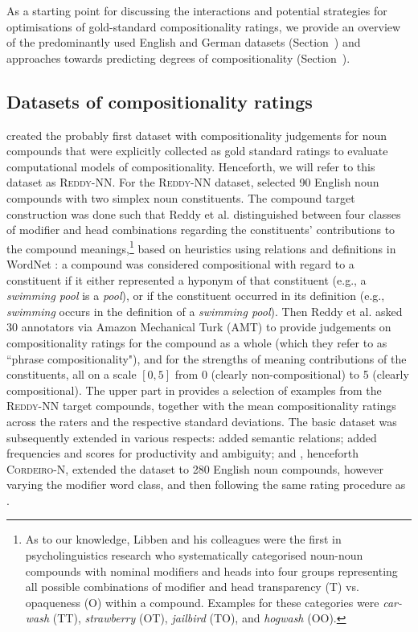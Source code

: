 \documentclass[output=paper,colorlinks,citecolor=brown]{langscibook}
\begin{document}
As a starting point for discussing the interactions and potential strategies for optimisations of gold-standard compositionality ratings, we provide an overview of the predominantly used English and German datasets (Section~) and approaches towards predicting degrees of compositionality (Section~).

\subsection{Datasets of compositionality ratings}\label{sec:overview-datasets}

\citet{ReddyEtAl:11a} created the probably first dataset with compositionality judgements for noun compounds that were explicitly collected as gold standard ratings to evaluate computational models of compositionality. Henceforth, we will refer to this dataset as \textsc{Reddy-NN}. For the \textsc{Reddy-NN} dataset, \citet{ReddyEtAl:11a} selected 90 English noun compounds with two simplex noun constituents. The compound target construction was done such that Reddy et al. distinguished between four classes of modifier and head combinations regarding the constituents' contributions to the compound meanings,\footnote{As to our knowledge, Libben and his colleagues \citep{LibbenEtAl:97, LibbenEtAl:03} were the first in psycholinguistics research who systematically categorised noun-noun compounds with nominal modifiers and heads into four groups representing all possible combinations of modifier and head transparency (T) vs. opaqueness (O) within a compound. Examples for these categories were \textit{car-wash} (TT), \textit{strawberry} (OT), \textit{jailbird} (TO), and \textit{hogwash} (OO).} based on heuristics using relations and definitions in WordNet \citep{Fellbaum:98}: a compound was considered compositional with regard to a constituent if it either represented a hyponym of that constituent (e.g., a \textit{swimming pool} is a \textit{pool}), or if the constituent occurred in its definition (e.g., \textit{swimming} occurs in the definition of a \textit{swimming pool}). Then Reddy et al. asked 30 annotators via Amazon Mechanical Turk (AMT) to provide judgements on compositionality ratings for the compound as a whole (which they refer to as ``phrase compositionality"), and for the strengths of meaning contributions of the constituents, all on a scale $[0,5]$ from 0 (clearly non-compositional) to 5 (clearly compositional). The upper part in  provides a selection of examples from the \textsc{Reddy-NN} target compounds, together with the mean compositionality ratings across the raters and the respective standard deviations. The basic dataset was subsequently extended in various respects: \citet{Bell/Schaefer:13} added semantic relations; \citet{SchulteImWaldeEtAl:16b} added frequencies and scores for productivity and ambiguity; and \citet{CordeiroEtAl:19}, henceforth \textsc{Cordeiro-N}, extended the dataset to 280 English noun compounds, however varying the modifier word class, and then following the same rating procedure as \citet{ReddyEtAl:11a}.
\end{document}
